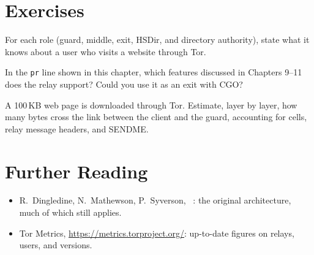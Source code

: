 \section*{Exercises}

\begin{esercizio}[1]\label{es:06-vista}
For each role (guard, middle, exit, HSDir, and directory authority), state what it knows about a user who visits a website through Tor.
\end{esercizio}

\begin{esercizio}[1]\label{es:06-pr}
In the \texttt{pr} line shown in this chapter, which features discussed in Chapters 9--11 does the relay support? Could you use it as an exit with CGO?
\end{esercizio}

\begin{esercizio}[2]\label{es:06-livelli}
A 100\,KB web page is downloaded through Tor. Estimate, layer by layer, how many bytes cross the link between the client and the guard, accounting for cells, relay message headers, and SENDME.
\end{esercizio}

\section*{Further Reading}
\begin{itemize}
  \item R.~Dingledine, N.~Mathewson, P.~Syverson, ~\cite{dingledine2004tor}: the original architecture, much of which still applies.
  \item Tor Metrics, \url{https://metrics.torproject.org/}: up-to-date figures on relays, users, and versions.
\end{itemize}

